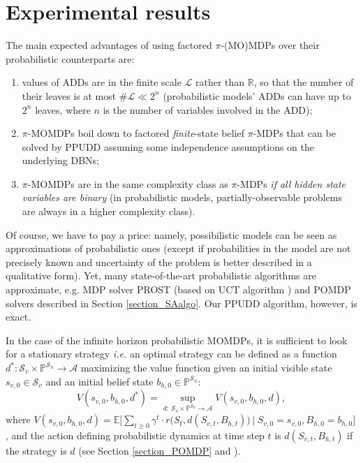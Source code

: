 \section{Experimental results}
\label{section_expe_PPUDD}
The main expected advantages of using factored
$\pi$-(MO)MDPs over their probabilistic counterparts are: 
\begin{enumerate}
\item values of ADDs are
in the finite scale $\mathcal{L}$ rather than $\mathbb{R}$, so that the number of
their leaves is at most $\#\mathcal{L} \ll 2^n$ (probabilistic models' ADDs can have
up to $2^n$ leaves, where $n$ is the number of variables involved in the ADD);
\item $\pi$-MOMDPs boil down to factored \emph{finite}-state
belief $\pi$-MDPs that can be solved by PPUDD assuming some independence
assumptions on the underlying DBNs; 
\item $\pi$-MOMDPs are in the same
complexity class as $\pi$-MDPs \textit{if all hidden state variables are binary}
(in probabilistic models, partially-observable problems are always in a higher
complexity class). 
\end{enumerate}
Of course, we have to pay a price: namely, possibilistic models can be seen as approximations 
of probabilistic ones 
(except if probabilities in the model are not precisely known
and uncertainty of the problem is better described in a qualitative form). 
Yet, many state-of-the-art probabilistic
algorithms are approximate, 
e.g. MDP solver PROST \cite{DBLP:conf/aips/KellerE12} (based on UCT algorithm \cite{Kocsis:2006:BBM:2091602.2091633})
and POMDP solvers described in Section \ref{section_SAalgo}.
Our PPUDD algorithm, however, is exact.

In the case of the infinite horizon probabilistic MOMDPs, 
it is sufficient to look for a stationary strategy
\textit{i.e.} an optimal strategy can be defined as a function
$d^*: \mathcal{S}_v \times \mathbb{P}^{\mathcal{S}_h} \rightarrow \mathcal{A}$
maximizing the value function given an initial visible state $s_{v,0} \in \mathcal{S}_v$ 
and an initial belief state $b_{h,0} \in \mathbb{P}^{\mathcal{S}_h}$:
\[ V(s_{v,0},b_{h,0},d^*) = \displaystyle \sup_{d: \ \mathcal{S}_v \times \mathbb{P}^{\mathcal{S}_h} \rightarrow \mathcal{A}} V(s_{v,0},b_{h,0},d), \]
where $V(s_{v,0},b_{h,0},d) = \mathbb{E} \bigg[ \displaystyle  \sum_{t \geqslant 0} \gamma^t \cdot r\Big(S_t,d(S_{v,t},B_{h,t})\Big) \ \bigg\vert \ S_{v,0} = s_{v,0}, B_{h,0} = b_{h,0} \bigg] $,
and the action defining probabilistic dynamics at time step $t$ is $d(S_{v,t},B_{h,t})$ if the strategy is $d$ (see Section \ref{section_POMDP}
and \cite{OngShaoHsuWee-IJRR10,AraThoBufCha-ICTAI10}).

